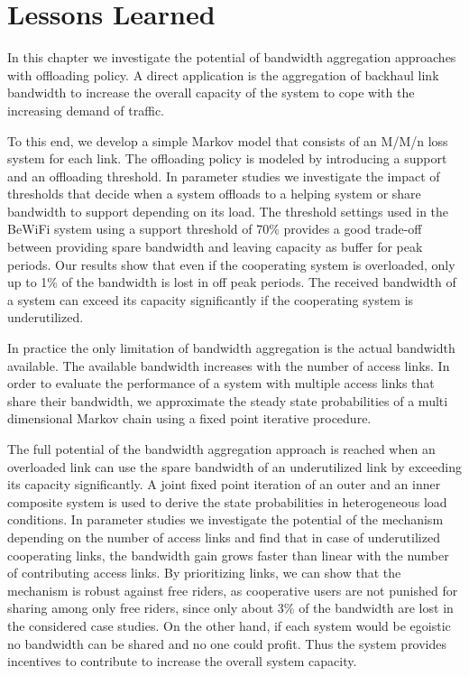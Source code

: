 \section{Lessons Learned}\label{sec:aggregation:lessonslearned}
In this chapter we investigate the potential of bandwidth aggregation approaches with offloading policy.
A direct application is the aggregation of backhaul link bandwidth to increase the overall capacity of the system to cope with the increasing demand of traffic. %

To this end, we develop a simple Markov model that consists of an M/M/n loss system for each link.
The offloading policy is modeled by introducing a support and an offloading threshold.
In parameter studies we investigate the impact of thresholds that decide when a system offloads to a helping system or share bandwidth to support depending on its load.
The threshold settings used in the BeWiFi system using a support threshold of 70\% provides a good trade-off between providing spare bandwidth and leaving capacity as buffer for peak periods.
Our results show that even if the cooperating system is overloaded, only up to 1\% of the bandwidth is lost in off peak periods.
The received bandwidth of a system can exceed its capacity significantly if the cooperating system is underutilized.

In practice the only limitation of bandwidth aggregation is the actual bandwidth available. The available bandwidth increases with the number of access links.
In order to evaluate the performance of a system with multiple access links that share their bandwidth, we approximate the steady state probabilities of a multi dimensional Markov chain using a fixed point iterative procedure.

The full potential of the bandwidth aggregation approach is reached when an overloaded link can use the spare bandwidth of an underutilized link by exceeding its capacity significantly.
A joint fixed point iteration of an outer and an inner composite system is used to derive the state probabilities in heterogeneous load conditions.
In parameter studies we investigate the potential of the mechanism depending on the number of access links and find that in case of underutilized cooperating links, the bandwidth gain grows faster than linear with the number of contributing access links.
By prioritizing links, we can show that the mechanism is robust against free riders, as cooperative users are not punished for sharing among only free riders, since only about 3\% of the bandwidth are lost in the considered case studies.
On the other hand, if each system would be egoistic no bandwidth can be shared and no one could profit.
Thus the system provides incentives to contribute to increase the overall system capacity.

